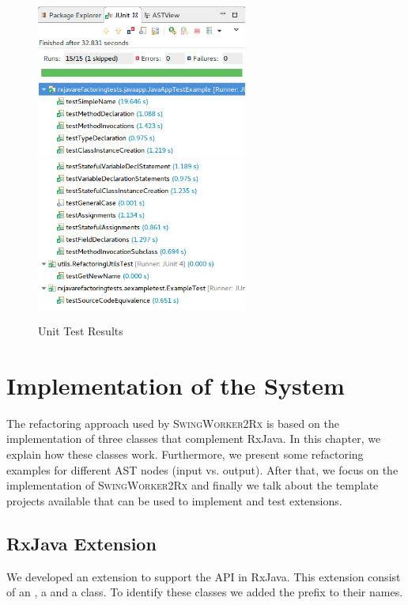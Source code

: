 \documentclass[type=bsc,accentcolor=tud9c]{tudthesis}
\newcommand{\framework}[1]{\textcolor{black!65}{#1}}
\newcommand{\toolextension}{\textsc{SwingWorker2Rx}}
\begin{document}
\begin{figure}[H]
\begin{center}
\includegraphics[height=5cm]{unit-tests/unit-tests-results1.png}
\includegraphics[height=5cm]{unit-tests/unit-tests-results2.png}
\end{center}
\caption{Unit Test Results}
\label{fig:unit-test-results}
\end{figure}

\chapter{Implementation of the System}
\label{chapter:implementation}
The refactoring approach used by \toolextension{} is based on the implementation of three classes that complement \framework{RxJava}. In this chapter, we explain how these classes work. Furthermore, we present some refactoring examples for different AST nodes (input vs. output). After that, we focus on the implementation of \toolextension{} and finally we talk about the template projects available that can be used to implement and test extensions.

\section{RxJava Extension}

We developed an extension to support the  API in \framework{RxJava}. This extension consist of an , a  and a  class. To identify these classes we added the prefix  to their names. 
\end{document}
